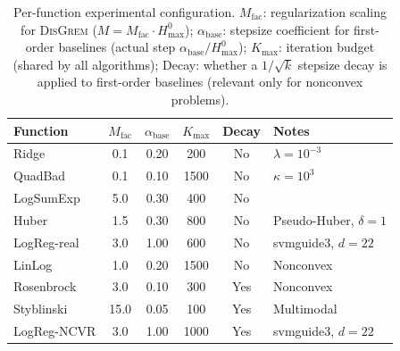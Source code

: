 \documentclass[review,onefignum,onetabnum]{siamart171218}
\begin{document}
	\begin{table}[htbp]
		\centering
		\caption{Per-function experimental configuration.
			$M_{\mathrm{fac}}$: regularization scaling for \textsc{DisGrem}
			($M = M_{\mathrm{fac}}\cdot H_{\max}^{0}$);
			$\alpha_{\mathrm{base}}$: stepsize coefficient for first-order
			baselines (actual step $\alpha_{\mathrm{base}}/H_{\max}^{0}$);
			$K_{\max}$: iteration budget (shared by all algorithms);
			Decay: whether a $1/\sqrt{k}$ stepsize decay is applied to
			first-order baselines (relevant only for nonconvex problems).}
		\label{tab:config}
		\setlength{\tabcolsep}{5pt}
		\small
		\begin{tabular}{lccccl}
			\toprule
			Function & $M_{\mathrm{fac}}$ & $\alpha_{\mathrm{base}}$ & $K_{\max}$ & Decay & Notes \\
			\midrule
			Ridge       & 0.1  & 0.20 &  200 & No  & $\lambda{=}10^{-3}$ \\
			QuadBad     & 0.1  & 0.10 & 1500 & No  & $\kappa{=}10^3$ \\
			LogSumExp   & 5.0  & 0.30 &  400 & No  & \\
			Huber       & 1.5  & 0.30 &  800 & No  & Pseudo-Huber, $\delta{=}1$ \\
			LogReg-real & 3.0  & 1.00 &  600 & No  & svmguide3, $d{=}22$ \\
		LinLog      & 1.0  & 0.20 & 1500 & No  & Nonconvex \\
		Rosenbrock  & 3.0  & 0.10 &  300 & Yes & Nonconvex \\
			Styblinski  & 15.0 & 0.05 &  100 & Yes & Multimodal \\
			LogReg-NCVR & 3.0  & 1.00 & 1000 & Yes & svmguide3, $d{=}22$ \\
			\bottomrule
		\end{tabular}
	\end{table}
	
\end{document}
